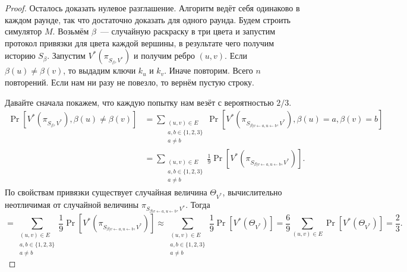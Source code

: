 \documentclass[12pt,a4paper]{article}
\theoremstyle{definition}
\theoremstyle{plain}
\theoremstyle{remark}
\begin{document}
\begin{proof}
Осталось доказать нулевое разглашение. Алгоритм ведёт себя одинаково в каждом раунде, так
что достаточно доказать для одного раунда. Будем строить симулятор $M$.
Возьмём $\beta$~--- случайную раскраску в три цвета и запустим протокол привязки
для цвета каждой вершины, в результате чего получим историю $S_\beta$.
Запустим $V^*(\pi_{S_\beta, V^*})$ и получим ребро $(u,v)$.
Если $\beta(u)\neq \beta(v)$, то выдадим ключи $k_u$ и $k_v$.
Иначе повторим. Всего $n$ повторений. Если нам ни разу не повезло, то вернём пустую строку.

Давайте сначала покажем, что каждую попытку нам везёт с вероятностью $2/3$.
\begin{align*}
\Pr[V^*(\pi_{S_\beta, V^*}), \beta(u)\neq\beta(v)] &= 
\sum_{\substack{(u,v)\in E\\a,b\in\{1,2,3\}\\a\neq b}} 
\Pr[V^*(\pi_{S_{\beta|v\gets a, u\gets b}, V^*}), \beta(u) = a, \beta(v) = b]\\
&=\sum_{\substack{(u,v)\in E\\a,b\in\{1,2,3\}\\a\neq b}} 
\frac{1}{9}\Pr[V^*(\pi_{S_{\beta|v\gets a, u\gets b}, V^*})].
\end{align*}
По свойствам привязки существует случайная величина $\Theta_{V^*}$,
вычислительно неотличимая от случайной величины $\pi_{S_{\beta|v\gets a, u\gets b}, V^*}$.
Тогда 
$$=\sum_{\substack{(u,v)\in E\\a,b\in\{1,2,3\}\\a\neq b}} 
\frac{1}{9}\Pr[V^*(\pi_{S_{\beta|v\gets a, u\gets b}, V^*})] \approx 
\sum_{\substack{(u,v)\in E\\a,b\in\{1,2,3\}\\a\neq b}} \frac{1}{9}\Pr[V^*(\Theta_{V^*})] = 
\frac{6}{9}\sum_{(u,v)\in E}\Pr[V^*(\Theta_{V^*})] = \frac{2}{3}.
$$


\end{proof}
\end{document}
